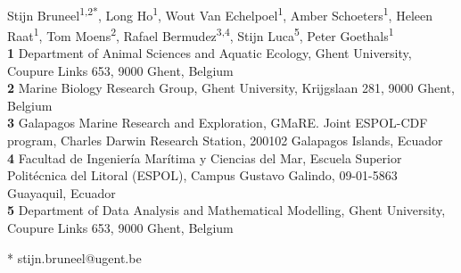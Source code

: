 \documentclass[10pt,letterpaper]{article}
\begin{document}
\vspace*{0.2in}

\begin{flushleft}
{\Large
\textbf{} %
}
\newline
\\
Stijn Bruneel\textsuperscript{1,2*},
Long Ho\textsuperscript{1},
Wout Van Echelpoel\textsuperscript{1},
Amber Schoeters\textsuperscript{1},
Heleen Raat\textsuperscript{1},
Tom Moens\textsuperscript{2},
Rafael Bermudez\textsuperscript{3,4},
Stijn Luca\textsuperscript{5},
Peter Goethals\textsuperscript{1}
\\
\bigskip
\textbf{1} Department of Animal Sciences and Aquatic Ecology, Ghent University, Coupure Links 653, 9000 Ghent, Belgium
\\
\textbf{2} Marine Biology Research Group, Ghent University, Krijgslaan 281, 9000 Ghent, Belgium
\\
\textbf{3} Galapagos Marine Research and Exploration, GMaRE. Joint ESPOL-CDF program, Charles Darwin Research Station, 200102 Galapagos Islands, Ecuador
\\
\textbf{4} Facultad de Ingeniería Marítima y Ciencias del Mar, Escuela Superior Politécnica del Litoral (ESPOL), Campus Gustavo Galindo, 09-01-5863 Guayaquil, Ecuador
\\
\textbf{5} Department of Data Analysis and Mathematical Modelling, Ghent University, Coupure Links 653, 9000 Ghent, Belgium
\\
\bigskip

% 
%





* stijn.bruneel@ugent.be

\end{flushleft}
\end{document}
